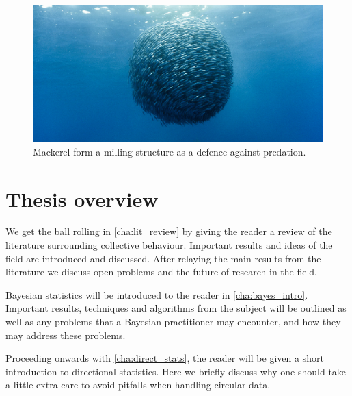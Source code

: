 \begin{figure}[tb]
    \includegraphics[width=\textwidth]{milling.jpg}
    \caption{Mackerel form a milling structure as a defence against predation.}
    \label{fig:milling}
\end{figure}

\section{Thesis overview}
\label{sec:overview_of_thesis}

We get the ball rolling in \cref{cha:lit_review} by giving the reader a
review of the literature surrounding collective behaviour. Important results and ideas of
the field are introduced and discussed. After relaying the main results from the
literature we discuss open problems and the future of research in the field.

Bayesian statistics will be introduced to the reader in \cref{cha:bayes_intro}. Important
results, techniques and algorithms from the subject will be outlined as well as any
problems that a Bayesian practitioner may encounter, and how they may address these problems.

Proceeding onwards with \cref{cha:direct_stats}, the reader will be given a short
introduction to directional statistics. Here we briefly discuss why one should take a
little extra care to avoid pitfalls when handling circular data.



